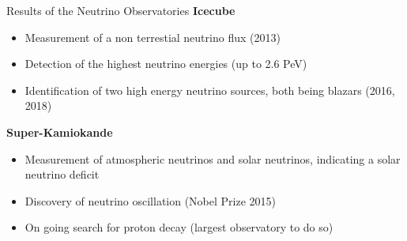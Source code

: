 \documentclass[aspectratio=1610, 10pt]{beamer}
\begin{document}
\begin{frame}{Results of the Neutrino Observatories}
\textbf{Icecube}
 \begin{itemize}
   \item Measurement of a non terrestial neutrino flux (2013)
   \medskip
   \item Detection of the highest neutrino energies (up to 2.6 PeV)
   \medskip
   \item Identification of two high energy neutrino sources, both being blazars (2016, 2018)
 \end{itemize}
\vspace{0.5cm}
\textbf{Super-Kamiokande}
  \begin{itemize}
    \item Measurement of atmospheric neutrinos and solar neutrinos, indicating a solar neutrino deficit
    \medskip
    \item Discovery of neutrino oscillation (Nobel Prize 2015)
    \medskip
    \item On going search for proton decay (largest observatory to do so)
  \end{itemize}
\end{frame}
\end{document}
